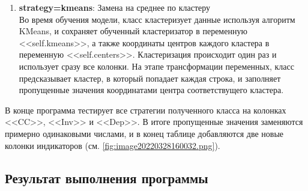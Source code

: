 \documentclass[12pt,a4paper]{article}
\begin{document}
\begin{enumerate}
    \item \textbf{strategy=kmeans}: Замена на среднее по кластеру \\
      Во время обучения модели, класс кластеризует данные используя алгоритм KMeans,
      и сохраняет обученный кластеризатор в переменную <<self.kmeans>>,
      а также координаты центров каждого кластера в переменную <<self.centers>>.
      Кластеризация происходит один раз и использует сразу все колонки.
      На этапе трансформации переменных, класс предсказывает кластер, в который попадает каждая строка,
      и заполняет пропущенные значения координатами центра соответствущего кластера.

  \end{enumerate}

  В конце программа тестирует все стратегии полученного класса на колонках <<CC>>, <<Inv>> и <<Dep>>.
  В итоге пропущенные значения заменяются примерно одинаковыми числами,
  и в конец таблице добавляются две новые колонки индикаторов (см. \autoref{fig:image20220328160032.png}).

  \subsection{Результат выполнения программы}
\end{document}
